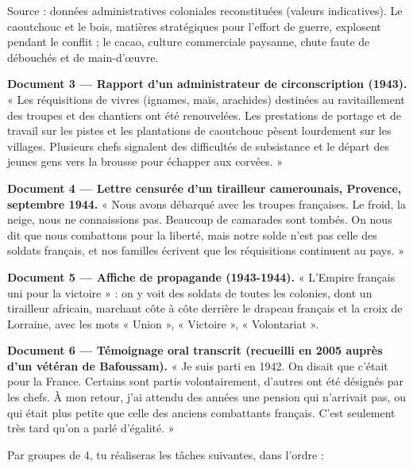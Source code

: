 \documentclass[11pt]{article}
\newcounter{popsec}
\newcounter{popsub}
\newcommand{\courssub}[1]{%
  \stepcounter{popsub}%
  \par\vspace{9pt}\noindent{\popxbold\fontsize{11.5}{13}\selectfont\color{popink}{\color{poporange}\thepopsec.\thepopsub}\hspace{6pt}#1}\par\nopagebreak\vspace{4pt}
}
\begin{document}
Source : données administratives coloniales reconstituées (valeurs indicatives). Le caoutchouc et le bois, matières stratégiques pour l'effort de guerre, explosent pendant le conflit ; le cacao, culture commerciale paysanne, chute faute de débouchés et de main-d'œuvre.

\textbf{Document 3 — Rapport d'un administrateur de circonscription (1943).} « Les réquisitions de vivres (ignames, maïs, arachides) destinées au ravitaillement des troupes et des chantiers ont été renouvelées. Les prestations de portage et de travail sur les pistes et les plantations de caoutchouc pèsent lourdement sur les villages. Plusieurs chefs signalent des difficultés de subsistance et le départ des jeunes gens vers la brousse pour échapper aux corvées. »

\textbf{Document 4 — Lettre censurée d'un tirailleur camerounais, Provence, septembre 1944.} « Nous avons débarqué avec les troupes françaises. Le froid, la neige, nous ne connaissions pas. Beaucoup de camarades sont tombés. On nous dit que nous combattons pour la liberté, mais notre solde n'est pas celle des soldats français, et nos familles écrivent que les réquisitions continuent au pays. »

\textbf{Document 5 — Affiche de propagande (1943-1944).} « L'Empire français uni pour la victoire » : on y voit des soldats de toutes les colonies, dont un tirailleur africain, marchant côte à côte derrière le drapeau français et la croix de Lorraine, avec les mots « Union », « Victoire », « Volontariat ».

\textbf{Document 6 — Témoignage oral transcrit (recueilli en 2005 auprès d'un vétéran de Bafoussam).} « Je suis parti en 1942. On disait que c'était pour la France. Certains sont partis volontairement, d'autres ont été désignés par les chefs. À mon retour, j'ai attendu des années une pension qui n'arrivait pas, ou qui était plus petite que celle des anciens combattants français. C'est seulement très tard qu'on a parlé d'égalité. »

\courssub{Consignes}

Par groupes de 4, tu réaliseras les tâches suivantes, dans l'ordre :
\end{document}
